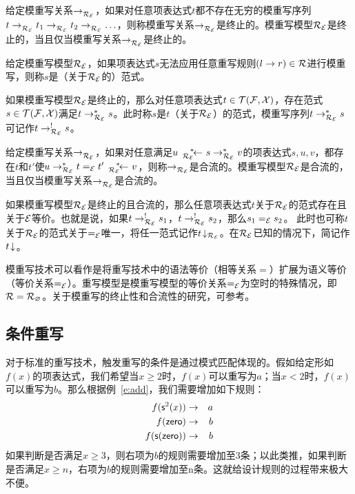\begin{definition}
给定模重写关系$\lrps{}{\RE}$，如果对任意项表达式$t$都不存在无穷的模重写序列$t\lrps{}{\RE} t_1 \lrps{}{\RE} t_2 \lrps{}{\RE} \ldots$，则称模重写关系$\lrps{}{\RE}$是终止的。模重写模型$\RE$是终止的，当且仅当模重写关系$\lrps{}{\RE}$是终止的。
\end{definition}

\begin{definition}
给定模重写模型$\RE$，如果项表达式$s$无法应用任意重写规则$(l \ra r)\in \cR$进行模重写，则称$s$是（关于$\RE$的）范式。
\end{definition}

\begin{lemma}
如果模重写模型$\RE$是终止的，那么对任意项表达式$t\in\TFX$，存在范式$s\in\TFX$满足$t\lrps{*}{\RE} s$。此时称$s$是$t$（关于$\RE$）的范式，模重写序列$t\lrps{*}{\RE} s$可记作$t\lrps{!}{\RE} s$。
\end{lemma}

\begin{definition}
给定模重写关系$\lrps{}{\RE}$，如果对任意满足$u\rlps{*}{\RE} s \lrps{*}{\RE} v$的项表达式$s,u,v$，都存在$t$和$t'$使$u\lrps{*}{\RE} t =_{\cE} t' \rlps{*}{\RE} v$，则称$\lrps{}{\RE}$是合流的。模重写模型$\RE$是合流的，当且仅当模重写关系$\lrps{}{\RE}$是合流的。
\end{definition}

\begin{lemma}
如果模重写模型$\RE$是终止的且合流的，那么任意项表达式$t$关于$\RE$的范式存在且关于$\cE$等价。也就是说，如果$t\lrps{!}{\RE} s_1$，$t\lrps{!}{\RE} s_2$，那么$s_1 =_{\cE} s_2$。 此时也可称$t$关于$\RE$的范式关于$=_{\cE}$唯一，将任一范式记作$\nf{t}{\RE}$。在$\RE$已知的情况下，简记作$\nf{t}{}$。
\end{lemma}

模重写技术可以看作是将重写技术中的语法等价（相等关系$=$）扩展为语义等价（等价关系$=_{\cE}$）。重写模型是模重写模型的等价关系$=_{\cE}$为空时的特殊情况，即$\cR = \cR_{\emptyset}$。关于模重写的终止性和合流性的研究，可参考。


\subsection{条件重写}

对于标准的重写技术，触发重写的条件是通过模式匹配体现的。假如给定形如$f(x)$的项表达式，我们希望当$x\ge 2$时，$f(x)$可以重写为$a$；当$x<2$时，$f(x)$可以重写为$b$。那么根据例~\ref{e:add}，我们需要增加如下规则：
\begin{eqnarray}
f(\s^2(x)) & \ra & a \nonumber \\
f(\zero)  & \ra & b \nonumber \\
f(\s(\zero)) & \ra & b \nonumber
\end{eqnarray}
如果判断是否满足$x\ge 3$，则右项为$b$的规则需要增加至3条；以此类推，如果判断是否满足$x\ge n$，右项为$b$的规则需要增加至n条。这就给设计规则的过程带来极大不便。

